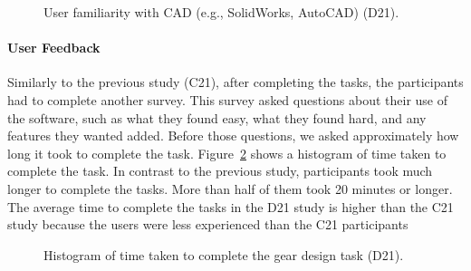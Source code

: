 \begin{doublespace}
\begin{figure}
    \centering
    \caption{User familiarity with CAD (e.g., SolidWorks, AutoCAD) (D21).}
    \label{fig:cad_second}
\end{figure}

\paragraph{User Feedback}

Similarly to the previous study (C21), after completing the tasks, the participants had to complete another survey. This survey asked questions about their use of the software, such as what they found easy, what they found hard, and any features they wanted added. Before those questions, we asked approximately how long it took to complete the task. Figure~\ref{fig:time_hist2} shows a histogram of time taken to complete the task. In contrast to the previous study, participants took much longer to complete the tasks. More than half of them took 20 minutes or longer. The average time to complete the tasks in the D21 study is higher than the C21 study because the users were less experienced than the C21 participants


\begin{figure}[htbp]
    \centering
{}
    \caption{Histogram of time taken to complete the gear design task (D21).}
    \label{fig:time_hist2}
\end{figure}


\end{doublespace}
